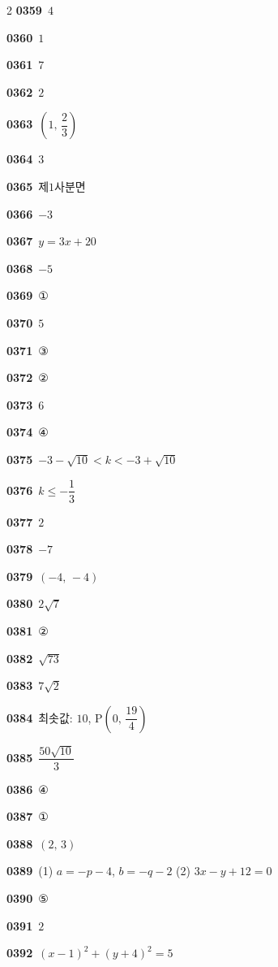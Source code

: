 \documentclass[10pt,a4paper]{article}
\newcommand{\pt}[1]{\mathrm{#1}}
\begin{document}
\begin{multicols}{2}
\noindent\textbf{0359}\ $4$\par
\noindent\textbf{0360}\ $1$\par
\noindent\textbf{0361}\ $7$\par
\noindent\textbf{0362}\ $2$\par
\noindent\textbf{0363}\ $\left(1,\,\dfrac{2}{3}\right)$\par
\noindent\textbf{0364}\ $3$\par
\noindent\textbf{0365}\ 제$1$사분면\par
\noindent\textbf{0366}\ $-3$\par
\noindent\textbf{0367}\ $y=3x+20$\par
\noindent\textbf{0368}\ $-5$\par
\noindent\textbf{0369}\ ①\par
\noindent\textbf{0370}\ $5$\par
\noindent\textbf{0371}\ ③\par
\noindent\textbf{0372}\ ②\par
\noindent\textbf{0373}\ $6$\par
\noindent\textbf{0374}\ ④\par
\noindent\textbf{0375}\ $-3-\sqrt{10}<k<-3+\sqrt{10}$\par
\noindent\textbf{0376}\ $k\le -\dfrac{1}{3}$\par
\noindent\textbf{0377}\ $2$\par
\noindent\textbf{0378}\ $-7$\par
\noindent\textbf{0379}\ $(-4,\,-4)$\par
\noindent\textbf{0380}\ $2\sqrt{7}$\par
\noindent\textbf{0381}\ ②\par
\noindent\textbf{0382}\ $\sqrt{73}$\par
\noindent\textbf{0383}\ $7\sqrt{2}$\par
\noindent\textbf{0384}\ 최솟값: $10$, $\pt{P}\left(0,\,\dfrac{19}{4}\right)$\par
\noindent\textbf{0385}\ $\dfrac{50\sqrt{10}}{3}$\par
\noindent\textbf{0386}\ ④\par
\noindent\textbf{0387}\ ①\par
\noindent\textbf{0388}\ $(2,\,3)$\par
\noindent\textbf{0389}\ (1) $a=-p-4$, $b=-q-2$ (2) $3x-y+12=0$\par
\noindent\textbf{0390}\ ⑤\par
\noindent\textbf{0391}\ $2$\par
\noindent\textbf{0392}\ $(x-1)^2+(y+4)^2=5$\par

\end{multicols}
\end{document}
